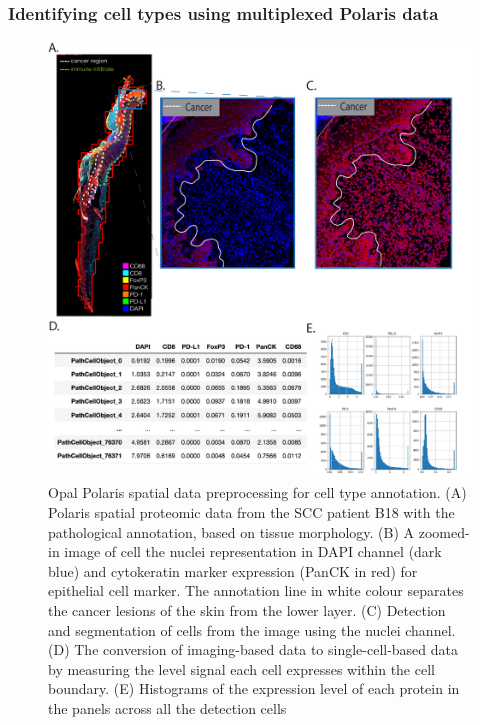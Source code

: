 \subsubsection{Identifying cell types using multiplexed Polaris data}
\begin{figure}[htp]
    \centering
    \includegraphics[width=\columnwidth]{Chapter3/Figures/Chap3_Figure1_1.png}
    \caption[Schematic of spatial data preprocessing for cell type annotation.]{ Opal Polaris spatial data preprocessing for cell type annotation. (A) Polaris spatial proteomic data from the SCC patient B18 with the pathological annotation, based on tissue morphology. (B) A zoomed-in image of cell the nuclei representation in DAPI channel (dark blue) and cytokeratin marker expression (PanCK in red) for epithelial cell marker. The annotation line in white colour separates the cancer lesions of the skin from the lower layer. (C) Detection and segmentation of cells from the image using the nuclei channel. (D) The conversion of imaging-based data to single-cell-based data by measuring the level signal each cell expresses within the cell boundary. (E) Histograms of the expression level of each protein in the panels across all the detection cells}
    \label{fig:Polaris_skin_cancer_preprocessing}
\end{figure}

